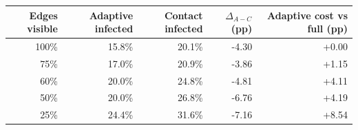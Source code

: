 \begin{tabular}{rrrrr}
\toprule
Edges visible & Adaptive infected & Contact infected & $\Delta_{A-C}$ (pp) & Adaptive cost vs full (pp) \\
\midrule
100\% & 15.8\% & 20.1\% & -4.30 & +0.00 \\
75\% & 17.0\% & 20.9\% & -3.86 & +1.15 \\
60\% & 20.0\% & 24.8\% & -4.81 & +4.11 \\
50\% & 20.0\% & 26.8\% & -6.76 & +4.19 \\
25\% & 24.4\% & 31.6\% & -7.16 & +8.54 \\
\bottomrule
\end{tabular}
